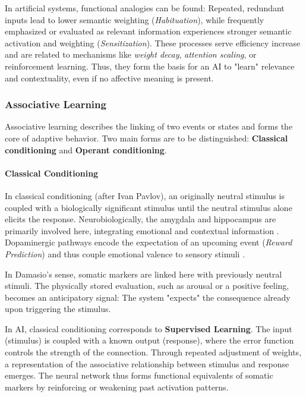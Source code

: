 In artificial systems, functional analogies can be found:
Repeated, redundant inputs lead to lower semantic weighting (\emph{Habituation}), while frequently emphasized or evaluated as relevant information experiences stronger semantic activation and weighting (\emph{Sensitization}). These processes serve efficiency increase and are related to mechanisms like \emph{weight decay}, \emph{attention scaling}, or reinforcement learning. Thus, they form the basis for an AI to "learn" relevance and contextuality, even if no affective meaning is present.

\subsubsection*{Associative Learning}

Associative learning describes the linking of two events or states and forms the core of adaptive behavior. Two main forms are to be distinguished: \textbf{Classical conditioning} and \textbf{Operant conditioning}.

\paragraph{Classical Conditioning}
In classical conditioning (after Ivan Pavlov), an originally neutral stimulus is coupled with a biologically significant stimulus until the neutral stimulus alone elicits the response. Neurobiologically, the amygdala and hippocampus are primarily involved here, integrating emotional and contextual information \cite{LeDoux1996, Phelps2004}. Dopaminergic pathways encode the expectation of an upcoming event (\emph{Reward Prediction}) and thus couple emotional valence to sensory stimuli \cite{Schultz1997}.

In Damasio's sense, somatic markers are linked here with previously neutral stimuli. The physically stored evaluation, such as arousal or a positive feeling, becomes an anticipatory signal: The system "expects" the consequence already upon triggering the stimulus.

In AI, classical conditioning corresponds to \textbf{Supervised Learning}. The input (stimulus) is coupled with a known output (response), where the error function controls the strength of the connection. Through repeated adjustment of weights, a representation of the associative relationship between stimulus and response emerges. The neural network thus forms functional equivalents of somatic markers by reinforcing or weakening past activation patterns.

